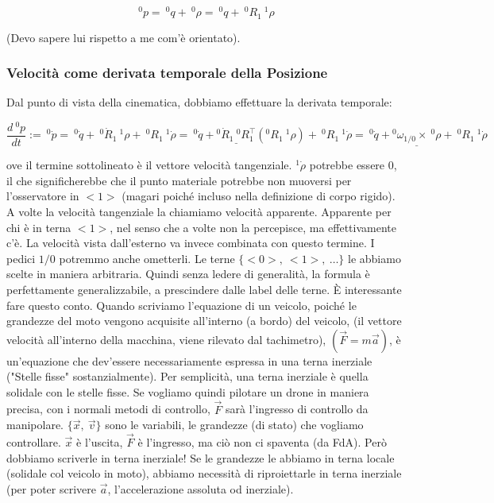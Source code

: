 \[
	^0p =\ ^0q +\ ^0\rho =\ ^0q +\ ^0R_1\ ^1\rho
\]

(Devo sapere lui rispetto a me com'è orientato).

\subsubsection{Velocità come derivata temporale della Posizione}

Dal punto di vista della cinematica, dobbiamo effettuare la derivata temporale:

\[
	\frac{d\ ^0p}{dt} :=\ ^0\dot{p} =\ ^0\dot{q} +\ ^0\dot{R}_1\ ^1\rho +\ ^0R_1\ ^1\dot{\rho} =\ ^0\dot{q} + \underline{^0\dot{R}_1\ ^0R_1^\top} (^0R_1\ ^1\rho) +\ ^0R_1\ ^1\dot{\rho} =\ ^0\dot{q} + \underline{^0\omega_{1/0}\times\ ^0\rho} +\ ^0R_1\ ^1\dot{\rho}
\]

ove il termine sottolineato è il vettore velocità tangenziale. $^1\dot{\rho}$ potrebbe essere 0, il che significherebbe che il punto materiale potrebbe non muoversi per l'osservatore in $<1>$ (magari poiché incluso nella definizione di corpo rigido). A volte la velocità tangenziale la chiamiamo velocità apparente. Apparente per chi è in terna $<1>$, nel senso che a volte non la percepisce, ma effettivamente c'è. La velocità vista dall'esterno va invece combinata con questo termine. I pedici $1/0$ potremmo anche ometterli. Le terne $\{<0>,\ <1>,\ \dots\}$ le abbiamo scelte in maniera arbitraria. Quindi senza ledere di generalità, la formula è perfettamente generalizzabile, a prescindere dalle label delle terne. \`E interessante fare questo conto. Quando scriviamo l'equazione di un veicolo, poiché le grandezze del moto vengono acquisite all'interno (a bordo) del veicolo, (il vettore velocità all'interno della macchina, viene rilevato dal tachimetro), $(\vec{F}=m\vec{a})$, è un'equazione che dev'essere necessariamente espressa in una terna inerziale ("Stelle fisse" sostanzialmente). Per semplicità, una terna inerziale è quella solidale con le stelle fisse. Se vogliamo quindi pilotare un drone in maniera precisa, con i normali metodi di controllo, $\vec{F}$ sarà l'ingresso di controllo da manipolare. $\{\vec{x},\ \vec{v}\}$ sono le variabili, le grandezze (di stato) che vogliamo controllare. $\vec{x}$ è l'uscita, $\vec{F}$ è l'ingresso, ma ciò non ci spaventa (da FdA). Però dobbiamo scriverle in terna inerziale! Se le grandezze le abbiamo in terna locale (solidale col veicolo in moto), abbiamo necessità di riproiettarle in terna inerziale (per poter scrivere $\vec{a}$, l'accelerazione assoluta od inerziale).


